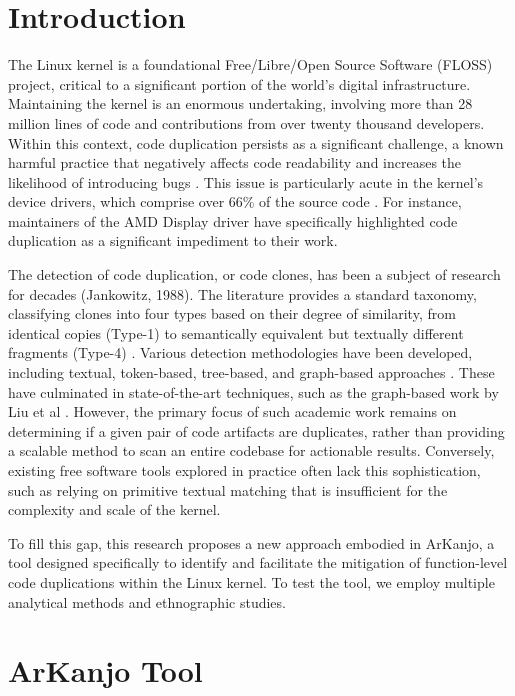 \documentclass[conference]{IEEEtran}
\begin{document}
\section{Introduction}

The Linux kernel is a foundational Free/Libre/Open Source Software (FLOSS) project, 
critical to a significant portion of the world's digital infrastructure. Maintaining 
the kernel is an enormous undertaking, involving more than 28 million lines of code 
and contributions from over twenty thousand developers. Within this context, code 
duplication persists as a significant challenge, a known harmful practice that 
negatively affects code readability and increases the likelihood of introducing bugs 
\cite{harmone,harmtwo}. This issue is particularly acute in the 
kernel's device drivers, which comprise over 66\% of the source code \cite{marcelo}. 
For instance, maintainers of the AMD Display driver have specifically highlighted code 
duplication as a significant impediment to their work.

The detection of code duplication, or code clones, has been a subject of research for 
decades (Jankowitz, 1988). The literature provides a standard taxonomy, classifying 
clones into four types based on their degree of similarity, from identical copies 
(Type-1) to semantically equivalent but textually different fragments (Type-4) \cite{litreview}. 
Various detection methodologies have been developed, including textual, token-based, 
tree-based, and graph-based approaches \cite{litreview}. These have culminated in 
state-of-the-art techniques, such as the graph-based work by Liu et al \cite{tailor}. 
However, the primary focus of such academic work remains on determining if a given 
pair of code artifacts are duplicates, rather than providing a scalable method to scan 
an entire codebase for actionable results. Conversely, existing free software tools explored 
in practice often lack this sophistication, such as relying on primitive textual matching 
that is insufficient for the complexity and scale of the kernel.

To fill this gap, this research proposes a new approach embodied in ArKanjo, a tool 
designed specifically to identify and facilitate the mitigation of function-level code 
duplications within the Linux kernel. To test the tool, we employ multiple analytical 
methods and ethnographic studies.

\section{ArKanjo Tool}
\end{document}
